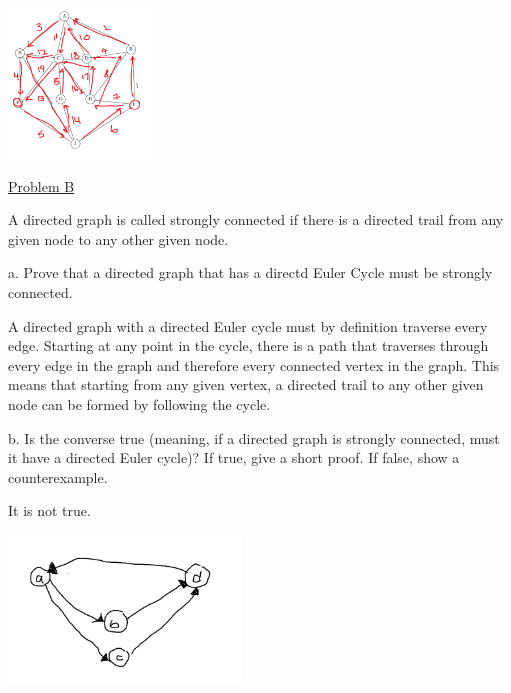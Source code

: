 \documentclass{article}
\begin{document}
\includegraphics[height=150px]{hw3apa.png}

\underline{Problem B}

A directed graph is called strongly connected if there is a directed trail from any given node to
any other given node.

a. Prove that a directed graph that has a directd Euler Cycle must be strongly connected.

A directed graph with a directed Euler cycle must by definition traverse every edge. Starting at any point in the cycle, there is a path that traverses through every edge in the graph and therefore every connected vertex in the graph. This means that starting from any given vertex, a directed trail to any other given node can be formed by following the cycle.

b.  Is the converse true (meaning, if a directed graph is strongly connected, must it have a directed Euler
cycle)? If true, give a short proof. If false, show a counterexample.

It is not true.

\includegraphics[height=150px]{hw3apb.png}
\end{document}
